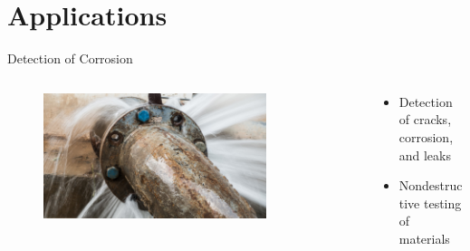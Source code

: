 \documentclass[12pt]{beamer}
\begin{document}
\section{Applications}
\begin{frame}{Detection of Corrosion}
    \begin{columns}
	\begin{column}{0.5\textwidth}
   		\begin{figure}
   		    \centering
   		    \includegraphics[width=0.8\textwidth]{pipebursting_photo_11-19-2023.jpeg}
   		    \label{fig:pipe}
   		\end{figure}
	\end{column}
	\begin{column}{0.5\textwidth}
   		\begin{itemize}
   		    \item Detection of cracks, corrosion, and leaks
         \item Nondestructive testing of materials
         
   		\end{itemize}
	\end{column}
 \end{columns}
\end{frame}
\end{document}
